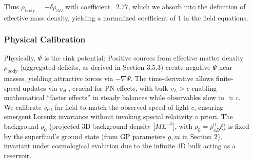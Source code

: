 Thus \(\rho_{\text{body}} = -\delta\rho_{3D}\) with coefficient ~2.77, which we absorb into the definition of effective mass density, yielding a normalized coefficient of 1 in the field equations.

\begin{center}
\end{center}

\subsubsection{Physical Calibration}

Physically, $\Psi$ is the sink potential: Positive sources from effective matter density $\rho_{\text{body}}$ (aggregated deficits, as derived in Section 3.5.3) create negative $\Psi$ near masses, yielding attractive forces via $-\nabla \Psi$. The time-derivative allows finite-speed updates via $v_{\text{eff}}$, crucial for PN effects, with bulk $v_L > c$ enabling mathematical ``faster effects'' in steady balances while observables slow to $\approx c$. We calibrate $v_{\text{eff}}$ far-field to match the observed speed of light $c$, ensuring emergent Lorentz invariance without invoking special relativity a priori. The background $\rho_0$ (projected 3D background density [$M L^{-3}$], with $\rho_0 = \rho_{4D}^0 \xi$) is fixed by the superfluid's ground state (from GP parameters $g, m$ in Section 2), invariant under cosmological evolution due to the infinite 4D bulk acting as a reservoir.

